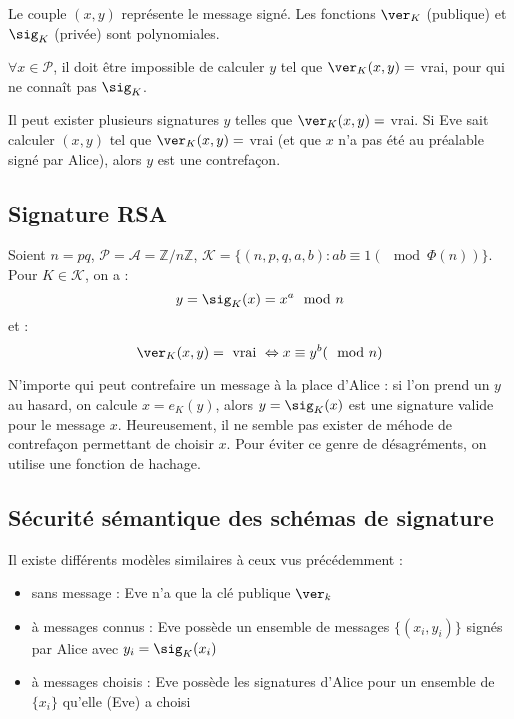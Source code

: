 \documentclass[a4paper, 10pt]{thesis}
\begin{document}
Le couple $(x, y)$ représente le message signé. Les fonctions $\ver_K$ (publique) et $\sig_K$
(privée) sont polynomiales.

$\forall x \in \mathcal{P}$, il doit être impossible de calculer $y$ tel que $\ver_K(x, y) = $ vrai,
pour qui ne connaît pas $\sig_K$.

\begin{rmq}
    Il peut exister plusieurs signatures $y$ telles que $\ver_K(x, y) = $ vrai. Si Eve sait calculer
    $(x, y)$ tel que $\ver_K(x, y) = $ vrai (et que $x$ n'a pas été au préalable signé par Alice),
    alors $y$ est une contrefaçon.
\end{rmq}

\subsection{Signature RSA}

Soient $n = pq$, $\mathcal{P} = \mathcal{A} = \mathbb{Z} / n\mathbb{Z}$, $\mathcal{K} = \{ (n, p, q,
a, b) : ab \equiv 1 (\mod \Phi(n)) \}$. Pour $K \in \mathcal{K}$, on a : 
\begin{displaymath}
    y = \sig_K(x) = x^a \mod n 
\end{displaymath}
et :
\begin{displaymath}
    \ver_K(x, y) = \mbox{ vrai } \Leftrightarrow x \equiv y^b (\mod n)
\end{displaymath}

\begin{rmq}
    N'importe qui peut contrefaire un message à la place d'Alice : si l'on prend un $y$ au hasard,
    on calcule $x = e_K(y)$, alors $y = \sig_K(x)$ est une signature valide pour le message $x$.
    Heureusement, il ne semble pas exister de méhode de contrefaçon permettant de choisir $x$.
    Pour éviter ce genre de désagréments, on utilise une fonction de hachage.
\end{rmq}

\subsection{Sécurité sémantique des schémas de signature}

Il existe différents modèles similaires à ceux vus précédemment :
\begin{itemize}
    \item sans message : Eve n'a que la clé publique $\ver_k$
    \item à messages connus : Eve possède un ensemble de messages $\{(x_i, y_i)\}$ signés par Alice
        avec $y_i = \sig_K(x_i)$
    \item à messages choisis : Eve possède les signatures d'Alice pour un ensemble de $\{x_i\}$
        qu'elle (Eve) a choisi
\end{itemize}
\end{document}
